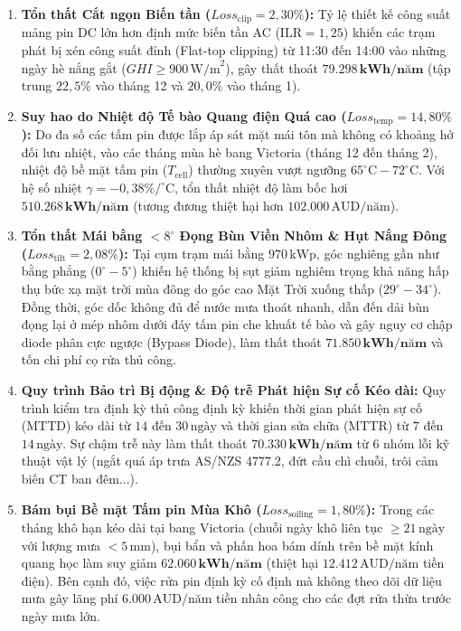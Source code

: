 \documentclass[12pt, a4paper]{report}
\begin{document}
\begin{enumerate}[label=\arabic*., leftmargin=*]
    \item \textbf{Tổn thất Cắt ngọn Biến tần ($Loss_{\text{clip}} = 2{,}30\%$):} 
    Tỷ lệ thiết kế công suất mảng pin DC lớn hơn định mức biến tần AC ($\text{ILR} = 1{,}25$) khiến các trạm phát bị xén công suất đỉnh (Flat-top clipping) từ 11:30 đến 14:00 vào những ngày hè nắng gắt ($GHI \ge 900\,\text{W/m}^2$), gây thất thoát $\mathbf{79.298\,\text{kWh/năm}}$ (tập trung $22{,}5\%$ vào tháng 12 và $20{,}0\%$ vào tháng 1).

    \item \textbf{Suy hao do Nhiệt độ Tế bào Quang điện Quá cao ($Loss_{\text{temp}} = 14{,}80\%$):} 
    Do đa số các tấm pin được lắp áp sát mặt mái tôn mà không có khoảng hở đối lưu nhiệt, vào các tháng mùa hè bang Victoria (tháng 12 đến tháng 2), nhiệt độ bề mặt tấm pin ($T_{\text{cell}}$) thường xuyên vượt ngưỡng $65^\circ\text{C} - 72^\circ\text{C}$. Với hệ số nhiệt $\gamma = -0{,}38\%/^\circ\text{C}$, tổn thất nhiệt độ làm bốc hơi $\mathbf{510.268\,\text{kWh/năm}}$ (tương đương thiệt hại hơn $102.000\,\text{AUD/năm}$).

    \item \textbf{Tổn thất Mái bằng $<8^\circ$ Đọng Bùn Viền Nhôm \& Hụt Nắng Đông ($Loss_{\text{tilt}} = 2{,}08\%$):} 
    Tại cụm trạm mái bằng $970\,\text{kWp}$, góc nghiêng gần như bằng phẳng ($0^\circ - 5^\circ$) khiến hệ thống bị sụt giảm nghiêm trọng khả năng hấp thụ bức xạ mặt trời mùa đông do góc cao Mặt Trời xuống thấp ($29^\circ - 34^\circ$). Đồng thời, góc dốc không đủ để nước mưa thoát nhanh, dẫn đến dải bùn đọng lại ở mép nhôm dưới đáy tấm pin che khuất tế bào và gây nguy cơ chập diode phân cực ngược (Bypass Diode), làm thất thoát $\mathbf{71.850\,\text{kWh/năm}}$ và tốn chi phí cọ rửa thủ công.

    \item \textbf{Quy trình Bảo trì Bị động \& Độ trễ Phát hiện Sự cố Kéo dài:} 
    Quy trình kiểm tra định kỳ thủ công định kỳ khiến thời gian phát hiện sự cố (MTTD) kéo dài từ $14$ đến $30\,\text{ngày}$ và thời gian sửa chữa (MTTR) từ $7$ đến $14\,\text{ngày}$. Sự chậm trễ này làm thất thoát $\mathbf{70.330\,\text{kWh/năm}}$ từ 6 nhóm lỗi kỹ thuật vật lý (ngắt quá áp trưa AS/NZS 4777.2, đứt cầu chì chuỗi, trôi cảm biến CT ban đêm...).

    \item \textbf{Bám bụi Bề mặt Tấm pin Mùa Khô ($Loss_{\text{soiling}} = 1{,}80\%$):} 
    Trong các tháng khô hạn kéo dài tại bang Victoria (chuỗi ngày khô liên tục $\ge 21\,\text{ngày}$ với lượng mưa $< 5\,\text{mm}$), bụi bẩn và phấn hoa bám dính trên bề mặt kính quang học làm suy giảm $\mathbf{62.060\,\text{kWh/năm}}$ (thiệt hại $12.412\,\text{AUD/năm}$ tiền điện). Bên cạnh đó, việc rửa pin định kỳ cố định mà không theo dõi dữ liệu mưa gây lãng phí $6.000\,\text{AUD/năm}$ tiền nhân công cho các đợt rửa thừa trước ngày mưa lớn.


\end{enumerate}
\end{document}
